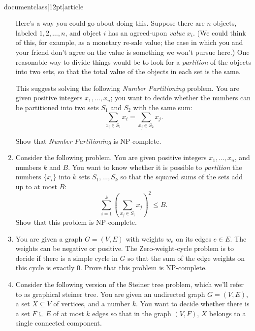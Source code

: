 \\documentclass[12pt]{article}
\begin{document}
\begin{enumerate}
Here's a way you could go about doing this.
Suppose there are $n$ objects, labeled $1, 2, \ldots, n$,
and object $i$ has an agreed-upon {\em value} $x_i$.
(We could think of this, for example, as a monetary re-sale value;
the case in which you and your friend don't agree on the
value is something we won't pursue here.)
One reasonable way to divide things would be to look
for a {\em partition} of the objects into two sets,
so that the total value of the objects in each set is the same.

This suggests solving the following
{\em Number Partitioning} problem.
You are given positive integers $x_1, \ldots, x_n$;
you want to decide whether 
the numbers can be partitioned into
two sets $S_1$ and $S_2$ with the same sum:
$$\sum_{x_i \in S_1} x_i = \sum_{x_j \in S_2} x_j.$$

Show that {\em Number Partitioning} is NP-complete.


\item 

Consider the following problem.
You are given positive integers $x_1, \ldots, x_n$, and
numbers $k$ and $B$.
You want to know whether it is possible to {\em partition}
the numbers $\{x_i\}$ into $k$ sets $S_1, \ldots, S_k$
so that the squared sums of the sets add up to at most $B$:
$$\sum_{i=1}^k \left(\sum_{x_j \in S_i} x_j \right)^2 \leq B.$$
Show that this problem is NP-complete.


\item 

You are given a graph $G=(V,E)$
with weights $w_e$ on its edges $e \in E$. The weights can be negative
or positive. The {\sc Zero-weight-cycle} problem is to decide if there
is a simple cycle in $G$ so that the sum of the
edge weights on this cycle is exactly $0$.
Prove that this problem is NP-complete.



\item 

Consider the following version of the Steiner tree
problem, which we'll refer to as {\sc graphical steiner tree}.
You are given an undirected graph $G = (V,E)$,
a set $X \subseteq V$ of vertices, and a number $k$.
You want to decide whether there is a set $F \subseteq E$ of at
most $k$ edges so that in the graph $(V,F)$,
$X$ belongs to a single connected component.


\end{enumerate}
\end{document}

